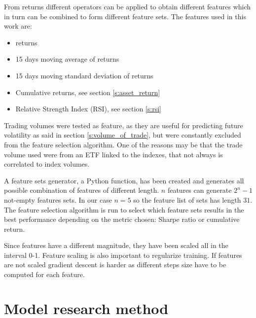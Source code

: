 \hfill \break

From returns different operators can be applied to obtain different features which in turn can be combined to form different feature sets. The features used in this work are:
\begin{itemize}
    \item returns
    \item 15 days moving average of returns
    \item 15 days moving standard deviation of returns
    \item Cumulative returns, see section \ref{s:asset_return} 
    \item Relative Strength Index (RSI), see section \ref{s:rsi}
\end{itemize}

\hfill \break
Trading volumes were tested as feature, as they are useful for predicting future volatility as said in section \ref{s:volume_of_trade}, but were constantly excluded from the feature selection algorithm. One of the reasons may be that the trade volume used were from an ETF linked to the indexes, that not always is correlated to index volumes.  

\hfill \break

A feature sets generator, a Python function, has been created and generates all possible combination of features of different length. $n$ features can generate $2^n -1$ not-empty features sets. In our case $n=5$ so the feature list of sets has length $31$. The  feature selection algorithm is run to select which feature sets results in the best performance depending on the metric chosen: Sharpe ratio or cumulative return. 

\hfill \break

Since features have a different magnitude, they have been scaled all in the interval 0-1. Feature scaling is also important to regularize training. If features are not scaled gradient descent is harder as different steps size have to be computed for each feature.

\section{Model research method}
\label{s:model_research_method}

